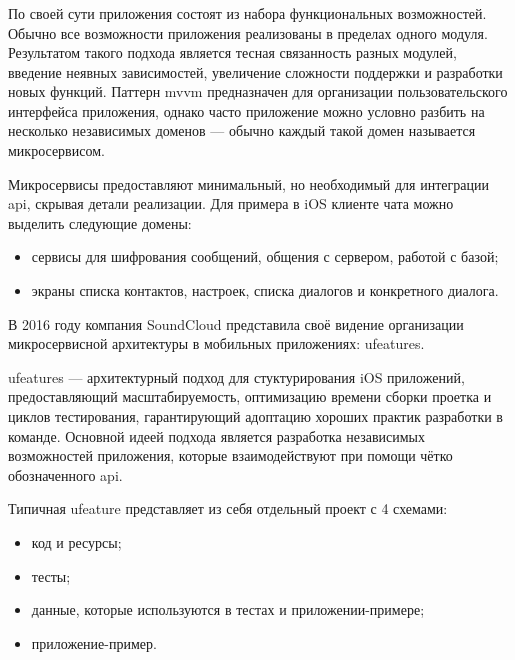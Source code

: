 \subsubsection{}
\label{sec:analysis:research:mobArch:ufeature}

По своей сути приложения состоят из набора функциональных возможностей. Обычно все возможности приложения реализованы в пределах одного модуля. Результатом такого подхода является тесная связанность разных модулей, введение неявных зависимостей, увеличение сложности поддержки и разработки новых функций. Паттерн \gls{mvvm} предназначен для организации пользовательского интерфейса приложения, однако часто приложение можно условно разбить на несколько независимых доменов --- обычно каждый такой домен называется микросервисом.

Микросервисы предоставляют минимальный, но необходимый для интеграции \gls{api}, скрывая детали реализации. Для примера в iOS клиенте чата можно выделить следующие домены:

\begin{itemize}
	\item сервисы для шифрования сообщений, общения с сервером, работой с базой;
	\item экраны списка контактов, настроек, списка диалогов и конкретного диалога.
\end{itemize}

В 2016 году компания SoundCloud представила своё видение организации микросервисной архитектуры в мобильных приложениях: \glspl{ufeature}.

\glspl{ufeature} --- архитектурный подход для стуктурирования iOS приложений, предоставляющий масштабируемость, оптимизацию времени сборки проетка и циклов тестирования, гарантирующий адоптацию хороших практик разработки в команде. Основной идеей подхода является разработка независимых возможностей приложения, которые взаимодействуют при помощи чётко обозначенного \gls{api}\cite{soundcloud:ufeature}.

Типичная \gls{ufeature} представляет из себя отдельный проект с 4 схемами:

\begin{itemize}
	\item код и ресурсы;
	\item тесты;
	\item данные, которые используются в тестах и приложении-примере;
	\item приложение-пример.
\end{itemize}

